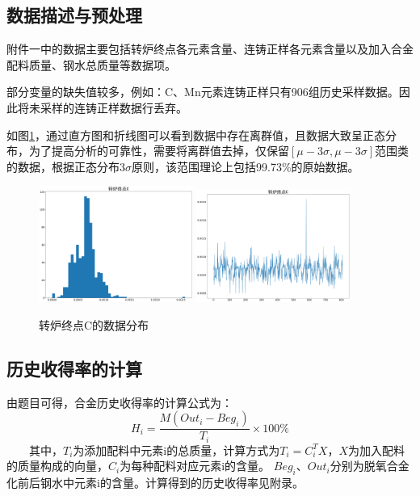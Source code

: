 \documentclass{xcumcmart}
\begin{document}
\subsection{数据描述与预处理}
\par 附件一中的数据主要包括转炉终点各元素含量、连铸正样各元素含量以及加入合金配料质量、钢水总质量等数据项。
\par 部分变量的缺失值较多，例如：C、Mn元素连铸正样只有906组历史采样数据。因此将未采样的连铸正样数据行丢弃。
\par 如图\ref{fig:prev}，通过直方图和折线图可以看到数据中存在离群值，且数据大致呈正态分布，为了提高分析的可靠性，需要将离群值去掉，仅保留$[\mu-3\sigma,\mu-3\sigma]$范围类的数据，根据正态分布3$\sigma$原则，该范围理论上包括99.73\%的原始数据。
\begin{figure}[htbp]
	\centering
	\includegraphics[width=0.45\textwidth]{fig/hist.png}
	\includegraphics[width=0.45\textwidth]{fig/index.png}
	\caption{转炉终点C的数据分布\label{fig:prev}}
\end{figure}
\subsection{历史收得率的计算}
由题目可得，合金历史收得率的计算公式为：
\begin{equation} \label{eq:eps1}
    H_i=\frac{M(Out_i-Beg_i)}{T_i}\times 100\%
\end{equation}
　　其中，$T_i$为添加配料中元素i的总质量，计算方式为$T_i=C_{i}^{T}X$，$X$为加入配料的质量构成的向量，$C_i$为每种配料对应元素i的含量。
$Beg_i$、$Out_i$分别为脱氧合金化前后钢水中元素i的含量。计算得到的历史收得率见附录。
\end{document}

